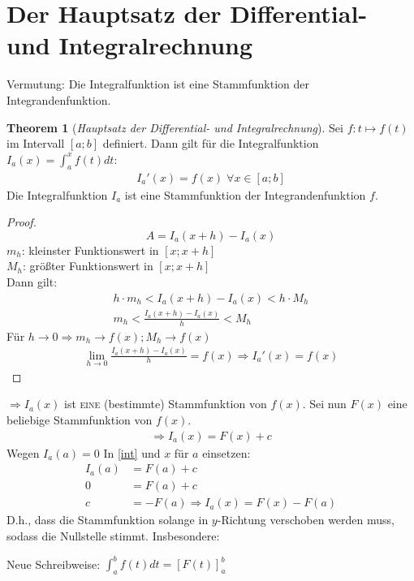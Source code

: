 \documentclass[a4paper,12pt,pointlessnumbers]{scrreprt}
\theoremstyle{definition}
\newtheorem{theorem}[definition]{Theorem}
\begin{document}
\section{Der Hauptsatz der Differential- und Integralrechnung}
Vermutung: Die Integralfunktion ist eine Stammfunktion der Integrandenfunktion.
\begin{theorem}[\emph{Hauptsatz der Differential- und Integralrechnung}]
Sei $f:t\mapsto f(t)$ im Intervall $[a;b]$ definiert. Dann gilt für die Integralfunktion $I_a (x)=\int_a^x f(t) dt$:
\begin{align*}
 I_a' (x)=f(x) \;\forall x \in [a;b]
\end{align*}
Die Integralfunktion $I_a$ ist eine Stammfunktion der Integrandenfunktion $f$.
\end{theorem}
\begin{proof}
\[A=I_a(x+h)-I_a(x)\]
$m_h$: kleinster Funktionswert in \([x;x+h]\)
\\ $M_h$: größter Funktionswert in \([x;x+h]\)
\\Dann gilt:
\begin{align*}
    h \cdot m_h < I_a(x+h)-I_a(x) < h \cdot M_h
    \\ m_h < \frac{I_a(x+h)-I_a(x)}{h}< M_h
\end{align*}
Für \(h\rightarrow 0 \Rightarrow m_h \rightarrow f(x); M_h \rightarrow f(x)\)
\begin{align*}
    \lim\limits_{h \to 0}   \frac{I_a(x+h)-I_a(x)}{h} = f(x)
    \Rightarrow I_a'(x)=f(x)
\end{align*}
\end{proof}
$\Rightarrow I_a(x)$ ist \textsc{eine} (bestimmte) Stammfunktion von $f(x)$. Sei nun $F(x)$ eine beliebige Stammfunktion von $f(x)$.
\begin{align}
    \Rightarrow I_a(x)= F(x)+c \label{int}
\end{align}
Wegen $I_a(a)=0$ 
In \ref{int} und $x$ für $a$ einsetzen:
\begin{align*}
    I_a(a)&=F(a)+c
    \\ 0&=F(a)+c
    \\ c&=-F(a)
    \Rightarrow I_a(x) = F(x)-F(a)
\end{align*}
D.h., dass die Stammfunktion solange in $y$-Richtung verschoben werden muss, sodass die Nullstelle stimmt.
Insbesondere:
\\ 
\begin{center}
\end{center}
    Neue Schreibweise: $\int_a^b f(t) dt=[F(t)]_a^b$ 
\end{document}
